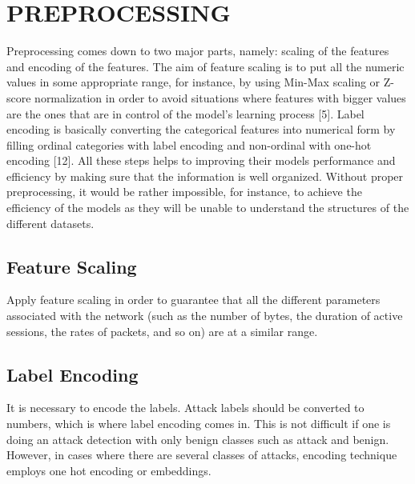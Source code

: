 \documentclass{llncs}
\begin{document}
\section{PREPROCESSING}
Preprocessing comes down to two major parts, namely: scaling of the features and encoding of the features. The aim of feature scaling is to put all the numeric values in some appropriate range, for instance, by using Min-Max scaling or Z-score normalization in order to avoid situations where features with bigger values are the ones that are in control of the model’s learning process [5]. Label encoding is basically converting the categorical features into numerical form by filling ordinal categories with label encoding and non-ordinal with one-hot encoding [12]. All these steps helps to improving their models performance and efficiency by making sure that the information is well organized. Without proper preprocessing, it would be rather impossible, for instance, to achieve the efficiency of the models as they will be unable to understand the structures of the different datasets.
\subsection{Feature Scaling}
Apply feature scaling in order to guarantee that all the different parameters associated with the network (such as the number of bytes, the duration of active sessions, the rates of packets, and so on) are at a similar range. 
\subsection{Label Encoding}
It is necessary to encode the labels. Attack labels should be converted to numbers, which is where label encoding comes in. This is not difficult if one is doing an attack detection with only benign classes such as attack and benign. However, in cases where there are several classes of attacks, encoding technique employs one hot encoding or embeddings.
\end{document}
